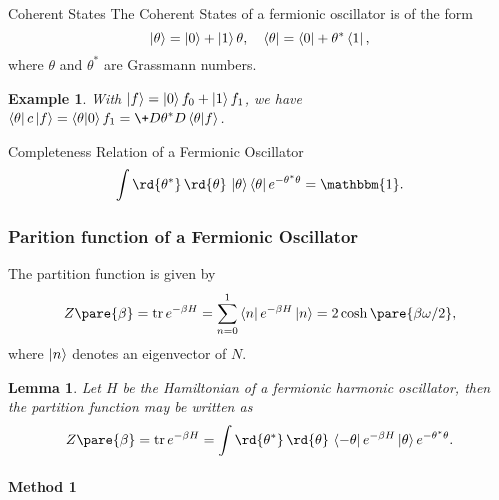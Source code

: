 \documentclass[hidelinks]{article}
\newtheorem{example}{Example}
\newtheorem{lemma}{Lemma}
\begin{document}
\begin{termdef}{Coherent States}
    The Coherent States of a fermionic oscillator is of the form
    \[ \ket{\theta} = \ket{0} + \ket{1}\theta,\quad \bra{\theta} = \bra{0} + \theta^*\bra{1}, \]
    where $\theta$ and $\theta^*$ are Grassmann numbers.
\end{termdef}
\begin{sample}
    \begin{example}
        With $\ket{f} = \ket{0}f_0 + \ket{1}f_1$, we have $\displaystyle \bra{\theta}c\ket{f} = \bra{\theta}\ket{0}f_1 = \+D{\theta^*}D{}\bra{\theta}\ket{f}$.
    \end{example}
\end{sample}
\begin{finaleq}{Completeness Relation of a Fermionic Oscillator}
    \begin{equation}
        \label{eq:completeness_relation_of_a_fermionic_oscillator}
        \int \rd{\theta^*}\,\rd{\theta}\, \ket{\theta}\bra{\theta}e^{-\theta^*\theta} = \mathbbm{1}.
    \end{equation}
\end{finaleq}


\subsubsection{Parition function of a Fermionic Oscillator} %
\label{ssub:parition_function_of_a_fermionic_oscillator}

The partition function is given by
\[ Z\pare{\beta} = \trace e^{-\beta H} = \sum_{n=0}^1 \bra{n}e^{-\beta H}\ket{n} = 2\cosh\pare{\beta \omega/2}, \]
where $\ket{n}$ denotes an eigenvector of $N$.
\begin{lemma}
    Let $H$ be the Hamiltonian of a fermionic harmonic oscillator, then the partition function may be written as
    \[ Z\pare{\beta} = \trace e^{-\beta H} = \int \rd{\theta^*}\,\rd{\theta}\,\bra{-\theta}e^{-\beta H}\ket{\theta} e^{-\theta^*\theta}. \]
\end{lemma}

\paragraph{Method 1} %
\label{par:method_1}
\end{document}
